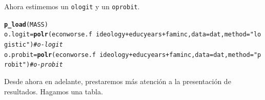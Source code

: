 \documentclass[onesided]{article}\usepackage[]{graphicx}\usepackage[]{color}
\makeatletter
\newcommand{\hlstr}[1]{\textcolor[rgb]{0.192,0.494,0.8}{#1}}%
\newcommand{\hlcom}[1]{\textcolor[rgb]{0.678,0.584,0.686}{\textit{#1}}}%
\newcommand{\hlopt}[1]{\textcolor[rgb]{0,0,0}{#1}}%
\newcommand{\hlstd}[1]{\textcolor[rgb]{0.345,0.345,0.345}{#1}}%
\newcommand{\hlkwb}[1]{\textcolor[rgb]{0.69,0.353,0.396}{#1}}%
\newcommand{\hlkwc}[1]{\textcolor[rgb]{0.333,0.667,0.333}{#1}}%
\newcommand{\hlkwd}[1]{\textcolor[rgb]{0.737,0.353,0.396}{\textbf{#1}}}%
\newenvironment{kframe}{%
 \def\at@end@of@kframe{}%
 \ifinner\ifhmode%
  \def\at@end@of@kframe{\end{minipage}}%
  \begin{minipage}{\columnwidth}%
 \fi\fi%
 \def\FrameCommand##1{\hskip\@totalleftmargin \hskip-\fboxsep
 \colorbox{shadecolor}{##1}\hskip-\fboxsep
     \hskip-\linewidth \hskip-\@totalleftmargin \hskip\columnwidth}%
 \MakeFramed {\advance\hsize-\width
   \@totalleftmargin\z@ \linewidth\hsize
   \@setminipage}}%
 {\par\unskip\endMakeFramed%
 \at@end@of@kframe}
\newenvironment{knitrout}{}{} %
\makeatother
\begin{document}
Ahora estimemos un \texttt{ologit} y un \texttt{oprobit}.

\begin{knitrout}
\color{fgcolor}\begin{kframe}
\begin{alltt}
\hlkwd{p_load}\hlstd{(MASS)}
\hlstd{o.logit} \hlkwb{=} \hlkwd{polr}\hlstd{(econworse.f} \hlopt{~} \hlstd{ideology} \hlopt{+} \hlstd{educyears} \hlopt{+} \hlstd{faminc,} \hlkwc{data} \hlstd{= dat,}  \hlkwc{method} \hlstd{=} \hlstr{"logistic"}\hlstd{)} \hlcom{# o-logit}
\hlstd{o.probit} \hlkwb{=} \hlkwd{polr}\hlstd{(econworse.f} \hlopt{~} \hlstd{ideology} \hlopt{+} \hlstd{educyears} \hlopt{+} \hlstd{faminc,} \hlkwc{data} \hlstd{= dat,}  \hlkwc{method} \hlstd{=} \hlstr{"probit"}\hlstd{)} \hlcom{# o-probit}
\end{alltt}
\end{kframe}
\end{knitrout}

Desde ahora en adelante, prestaremos m\'as atenci\'on a la presentaci\'on de resultados. Hagamos una tabla.
\end{document}
